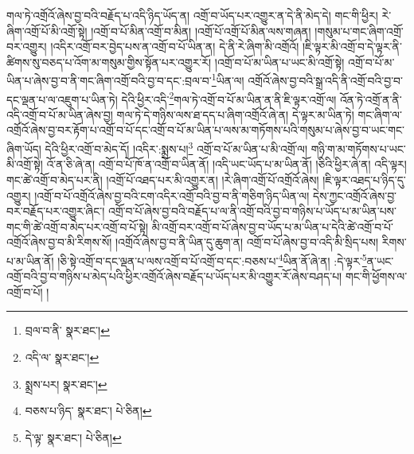 གལ་ཏེ་འགྲོའོ་ཞེས་བྱ་བའི་བརྗོད་པ་འདི་ཉིད་ཡོད་ན། འགྲོ་བ་ཡོད་པར་འགྱུར་ན་དེ་ནི་མེད་དེ། གང་གི་ཕྱིར། རེ་ཞིག་འགྲོ་པོ་མི་འགྲོ་སྟེ། །འགྲོ་བ་པོ་མིན་འགྲོ་བ་མིན། །འགྲོ་པོ་འགྲོ་པོ་མིན་ལས་གཞན། །གསུམ་པ་གང་ཞིག་འགྲོ་བར་འགྱུར། །འདིར་འགྲོ་བར་བྱེད་པས་ན་འགྲོ་བ་པོ་ཡིན་ན། དེ་ནི་རེ་ཞིག་མི་འགྲོའོ། །ཇི་ལྟར་མི་འགྲོ་བ་དེ་ལྟར་ནི་ཚིགས་སུ་བཅད་པ་འོག་མ་གསུམ་གྱིས་སྟོན་པར་འགྱུར་རོ། །འགྲོ་བ་པོ་མ་ཡིན་པ་ཡང་མི་འགྲོ་སྟེ། འགྲོ་བ་པོ་མ་ཡིན་པ་ཞེས་བྱ་བ་ནི་གང་ཞིག་འགྲོ་བའི་བྱ་བ་དང་:བྲལ་བ་\footnote{བྲལ་བ་ནི་  སྣར་ཐང་། }ཡིན་ལ། འགྲོའོ་ཞེས་བྱ་བའི་སྒྲ་འདི་ནི་འགྲོ་བའི་བྱ་བ་དང་ལྡན་པ་ལ་འཇུག་པ་ཡིན་ཏེ། དེའི་ཕྱིར་འདི་\footnote{འདི་ལ་  སྣར་ཐང་། }གལ་ཏེ་འགྲོ་བ་པོ་མ་ཡིན་ན་ནི་ཇི་ལྟར་འགྲོ་ལ། འོན་ཏེ་འགྲོ་ན་ནི་འདི་འགྲོ་བ་པོ་མ་ཡིན་ཞེས་བྱ། གལ་ཏེ་དེ་གཉིས་ལས་ཐ་དད་པ་ཞིག་འགྲོའོ་ཞེ་ན། དེ་ལྟར་མ་ཡིན་ཏེ། གང་ཞིག་ལ་འགྲོའོ་ཞེས་བྱ་བར་རྟོག་པ་འགྲོ་བ་པོ་དང་འགྲོ་བ་པོ་མ་ཡིན་པ་ལས་མ་གཏོགས་པའི་གསུམ་པ་ཞེས་བྱ་བ་ཡང་གང་ཞིག་ཡོད། དེའི་ཕྱིར་འགྲོ་བ་མེད་དོ། །འདིར་:སྨྲས་པ།\footnote{སྨྲས་པར།  སྣར་ཐང་། } འགྲོ་བ་པོ་མ་ཡིན་པ་མི་འགྲོ་ལ། གཉི་ག་མ་གཏོགས་པ་ཡང་མི་འགྲོ་སྟེ། འོ་ན་ཅི་ཞེ་ན། འགྲོ་བ་པོ་ཁོ་ན་འགྲོ་བ་ཡིན་ནོ། །འདི་ཡང་ཡོད་པ་མ་ཡིན་ནོ། །ཅིའི་ཕྱིར་ཞེ་ན། འདི་ལྟར། གང་ཚེ་འགྲོ་བ་མེད་པར་ནི། །འགྲོ་པོ་འཐད་པར་མི་འགྱུར་ན། །རེ་ཞིག་འགྲོ་པོ་འགྲོའོ་ཞེས། །ཇི་ལྟར་འཐད་པ་ཉིད་དུ་འགྱུར། །འགྲོ་བ་པོ་འགྲོའོ་ཞེས་བྱ་བའི་ངག་འདིར་འགྲོ་བའི་བྱ་བ་ནི་གཅིག་ཉིད་ཡིན་ལ། དེས་ཀྱང་འགྲོའོ་ཞེས་བྱ་བར་བརྗོད་པར་འགྱུར་ཞིང་། འགྲོ་བ་པོ་ཞེས་བྱ་བའི་བརྗོད་པ་ལ་ནི་འགྲོ་བའི་བྱ་བ་གཉིས་པ་ཡོད་པ་མ་ཡིན་པས་གང་གི་ཚེ་འགྲོ་བ་མེད་པར་འགྲོ་བ་པོ་སྟེ། མི་འགྲོ་བར་འགྲོ་བ་པོ་ཞེས་བྱ་བ་ཡོད་པ་མ་ཡིན་པ་དེའི་ཚེ་འགྲོ་བ་པོ་འགྲོའོ་ཞེས་བྱ་བ་མི་རིགས་སོ། །འགྲོའོ་ཞེས་བྱ་བ་ནི་ཡིན་དུ་ཆུག་ན། འགྲོ་བ་པོ་ཞེས་བྱ་བ་འདི་མི་སྲིད་པས། རིགས་པ་མ་ཡིན་ནོ། །ཅི་སྟེ་འགྲོ་བ་དང་ལྡན་པ་ལས་འགྲོ་བ་པོ་འགྲོ་བ་དང་:བཅས་པ་\footnote{བཅས་པ་ཉིད་  སྣར་ཐང་།  པེ་ཅིན། }ཡིན་ནོ་ཞེ་ན། :དེ་ལྟར་\footnote{དེ་ལྟ་  སྣར་ཐང་།  པེ་ཅིན། }ན་ཡང་འགྲོ་བའི་བྱ་བ་གཉིས་པ་མེད་པའི་ཕྱིར་འགྲོའོ་ཞེས་བརྗོད་པ་ཡོད་པར་མི་འགྱུར་རོ་ཞེས་བཤད་པ། གང་གི་ཕྱོགས་ལ་འགྲོ་བ་པོ། །
